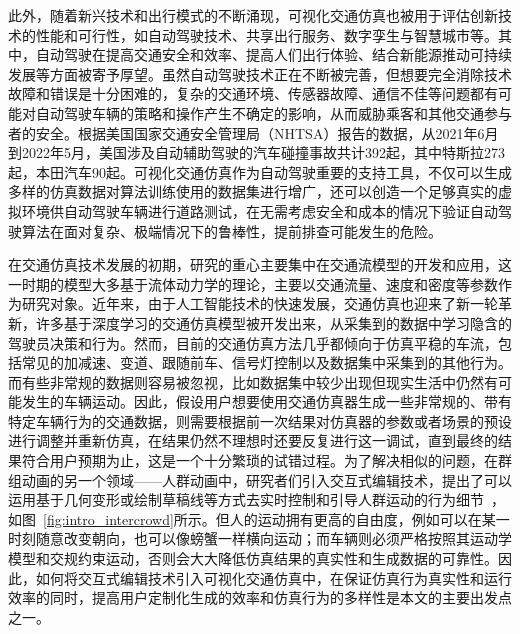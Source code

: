 
此外，随着新兴技术和出行模式的不断涌现，可视化交通仿真也被用于评估创新技术的性能和可行性，如自动驾驶技术、共享出行服务、数字孪生与智慧城市等。其中，自动驾驶在提高交通安全和效率、提高人们出行体验、结合新能源推动可持续发展等方面被寄予厚望。虽然自动驾驶技术正在不断被完善，但想要完全消除技术故障和错误是十分困难的，复杂的交通环境、传感器故障、通信不佳等问题都有可能对自动驾驶车辆的策略和操作产生不确定的影响，从而威胁乘客和其他交通参与者的安全。根据美国国家交通安全管理局（NHTSA）报告的数据，从2021年6月到2022年5月，美国涉及自动辅助驾驶的汽车碰撞事故共计392起，其中特斯拉273起，本田汽车90起。可视化交通仿真作为自动驾驶重要的支持工具，不仅可以生成多样的仿真数据对算法训练使用的数据集进行增广，还可以创造一个足够真实的虚拟环境供自动驾驶车辆进行道路测试，在无需考虑安全和成本的情况下验证自动驾驶算法在面对复杂、极端情况下的鲁棒性，提前排查可能发生的危险。

在交通仿真技术发展的初期，研究的重心主要集中在交通流模型的开发和应用，这一时期的模型大多基于流体动力学的理论，主要以交通流量、速度和密度等参数作为研究对象。近年来，由于人工智能技术的快速发展，交通仿真也迎来了新一轮革新，许多基于深度学习的交通仿真模型被开发出来，从采集到的数据中学习隐含的驾驶员决策和行为。然而，目前的交通仿真方法几乎都倾向于仿真平稳的车流，包括常见的加减速、变道、跟随前车、信号灯控制以及数据集中采集到的其他行为。而有些非常规的数据则容易被忽视，比如数据集中较少出现但现实生活中仍然有可能发生的车辆运动。因此，假设用户想要使用交通仿真器生成一些非常规的、带有特定车辆行为的交通数据，则需要根据前一次结果对仿真器的参数或者场景的预设进行调整并重新仿真，在结果仍然不理想时还要反复进行这一调试，直到最终的结果符合用户预期为止，这是一个十分繁琐的试错过程。为了解决相似的问题，在群组动画的另一个领域——人群动画中，研究者们引入交互式编辑技术，提出了可以运用基于几何变形或绘制草稿线等方式去实时控制和引导人群运动的行为细节~\cite{kim2014interactive, montana2017sketching}，如图~\ref{fig:intro_intercrowd}所示。但人的运动拥有更高的自由度，例如可以在某一时刻随意改变朝向，也可以像螃蟹一样横向运动；而车辆则必须严格按照其运动学模型和交规约束运动，否则会大大降低仿真结果的真实性和生成数据的可靠性。因此，如何将交互式编辑技术引入可视化交通仿真中，在保证仿真行为真实性和运行效率的同时，提高用户定制化生成的效率和仿真行为的多样性是本文的主要出发点之一。


